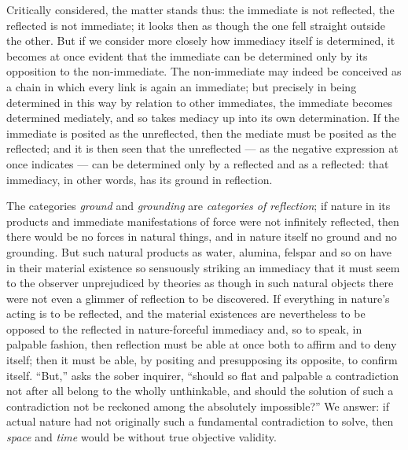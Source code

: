 \documentclass[12pt,a4paper]{book}
\begin{document}
Critically considered, the matter stands thus: the immediate is not reflected,
the reflected is not immediate; it looks then as though the one fell straight
outside the other. But if we consider more closely how immediacy itself is
determined, it becomes at once evident that the immediate can be determined
only by its opposition to the non-immediate. The non-immediate may indeed be
conceived as a chain in which every link is again an immediate; but precisely
in being determined in this way by relation to other immediates, the immediate
becomes determined mediately, and so takes mediacy up into its own
determination. If the immediate is posited as the unreflected, then the mediate
must be posited as the reflected; and it is then seen that the unreflected ---
as the negative expression at once indicates --- can be determined only by a
reflected and as a reflected: that immediacy, in other words, has its ground in
reflection.

The categories \emph{ground} and \emph{grounding} are \emph{categories of
reflection}; if nature in its products and immediate manifestations of force
were not infinitely reflected, then there would be no forces in natural things,
and in nature itself no ground and
no grounding. But such natural products as water, alumina, felspar and so on
have in their material existence so sensuously striking an immediacy that it
must seem to the observer unprejudiced by theories as though in such natural
objects there were not even a glimmer of reflection to be discovered. If
everything in nature's acting is to be reflected, and the material existences
are nevertheless to be opposed to the reflected in nature-forceful immediacy
and, so to speak, in palpable fashion, then reflection must be able at once
both to affirm and to deny itself; then it must be able, by positing and
presupposing its opposite, to confirm itself. ``But,'' asks the sober
inquirer, ``should so flat and palpable a contradiction not after all belong to
the wholly unthinkable, and should the solution of such a contradiction not be
reckoned among the absolutely impossible?'' We answer: if actual nature had not
originally such a fundamental contradiction to solve, then \emph{space} and
\emph{time} would be without true objective validity.
\end{document}
